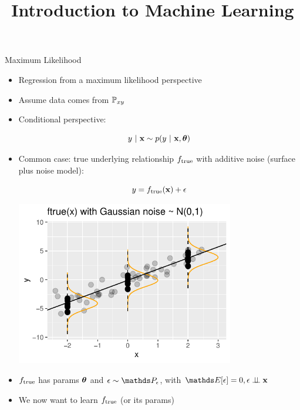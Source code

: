 \documentclass[11pt,compress,t,notes=noshow, xcolor=table]{beamer}
\title{Introduction to Machine Learning}
\begin{document}
    

\begin{vbframe}{Maximum Likelihood}

\begin{itemize}
\item Regression from a maximum likelihood perspective
\item Assume data comes from $\mathbb{P}_{xy}$ 
\item Conditional perspective: 

$$
	y~|~ \mathbf{x} \sim p(y~|~\mathbf{x}, \bm{\theta})
$$

\item
Common case:
true underlying relationship $f_{\text{true}}$ with additive noise (surface plus noise model): 

\begin{minipage}{0.5\textwidth}
$$
y = f_{\text{true}}(\mathbf{x}) + \epsilon
$$
\end{minipage}%
\begin{minipage}{0.5\textwidth}
\includegraphics[width = 0.75\textwidth]{figure/ftrue.pdf}
\end{minipage}

\item $f_{\text{true}}$ has params $\bm{\theta}$ and $\eps \sim\P_\eps$, with $\E[\eps] = 0, \epsilon \perp \!\!\! \perp \xv$

\item We now want to learn $f_{\text{true}}$ (or its params)


\end{itemize}
\end{vbframe}
\end{document}
